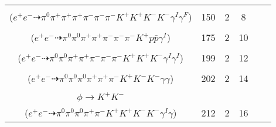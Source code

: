\documentclass[landscape]{article}
\newcounter{rownumbers}
\newcommand\rn{\stepcounter{rownumbers}\arabic{rownumbers}}
\newcommand{\EOLP}{\\ \hline} %
\newcommand{\topoTags}[1]{#1} %
\begin{document}
\begin{longtable}{clcccc}
\rn & \makecell[l]{ $ 
e^{+} e^{-} \rightarrow \rho^{0} \pi^{-} \bar{K}^{*} \bar{D}^{0} D_{s}^{+} \gamma^{I} ,
\rho^{0} \rightarrow \pi^{+} \pi^{-} ,
\bar{K}^{*} \rightarrow \pi^{+} K^{-} ,
\bar{D}^{0} \rightarrow \pi^{0} \pi^{-} K^{+} \gamma^{F} ,
D_{s}^{+} \rightarrow \pi^{+} K^{+} K^{-} 
$ \\ ($
e^{+} e^{-} \dashrightarrow \pi^{0} \pi^{+} \pi^{+} \pi^{+} \pi^{-} \pi^{-} \pi^{-} K^{+} K^{+} K^{-} K^{-} \gamma^{I} \gamma^{F} 
$) } & \topoTags{150 & }2 & 8 \EOLP

\rn & \makecell[l]{ $ 
e^{+} e^{-} \rightarrow D^{-} \bar{\Delta}^{0} \Sigma_{c}^{*+} \gamma^{I} ,
D^{-} \rightarrow \pi^{-} \pi^{-} K^{+} ,
\bar{\Delta}^{0} \rightarrow \pi^{+} \bar{p} ,
\Sigma_{c}^{*+} \rightarrow \pi^{0} \Lambda_{c}^{+} ,
\Lambda_{c}^{+} \rightarrow \pi^{0} \pi^{+} \Lambda ,
\Lambda \rightarrow \pi^{-} p 
$ \\ ($
e^{+} e^{-} \dashrightarrow \pi^{0} \pi^{0} \pi^{+} \pi^{+} \pi^{-} \pi^{-} \pi^{-} K^{+} p \bar{p} \gamma^{I} 
$) } & \topoTags{175 & }2 & 10 \EOLP

\rn & \makecell[l]{ $ 
e^{+} e^{-} \rightarrow \pi^{+} D^{*-} D^{0} \gamma^{I} \gamma^{I} ,
D^{*-} \rightarrow \pi^{-} \bar{D}^{0} ,
D^{0} \rightarrow \pi^{0} \pi^{+} \pi^{-} K^{+} K^{-} ,
\bar{D}^{0} \rightarrow \pi^{0} \pi^{-} K^{+} 
$ \\ ($
e^{+} e^{-} \dashrightarrow \pi^{0} \pi^{0} \pi^{+} \pi^{+} \pi^{-} \pi^{-} \pi^{-} K^{+} K^{+} K^{-} \gamma^{I} \gamma^{I} 
$) } & \topoTags{199 & }2 & 12 \EOLP

\rn & \makecell[l]{ $ 
e^{+} e^{-} \rightarrow \pi^{+} K^{*-} D^{-} D_{s}^{+} ,
K^{*-} \rightarrow \pi^{0} K^{-} ,
D^{-} \rightarrow \pi^{0} \pi^{-} K^{+} K^{-} ,
D_{s}^{+} \rightarrow \rho^{+} \eta ,
\rho^{+} \rightarrow \pi^{0} \pi^{+} ,
\eta \rightarrow \gamma \gamma 
$ \\ ($
e^{+} e^{-} \dashrightarrow \pi^{0} \pi^{0} \pi^{0} \pi^{+} \pi^{+} \pi^{-} K^{+} K^{-} K^{-} \gamma \gamma 
$) } & \topoTags{202 & }2 & 14 \EOLP

\rn & \makecell[l]{ $ 
e^{+} e^{-} \rightarrow K^{+} D^{*0} D_{s}^{*-} \gamma^{I} ,
D^{*0} \rightarrow \pi^{0} D^{0} ,
D_{s}^{*-} \rightarrow D_{s}^{-} \gamma ,
D^{0} \rightarrow \pi^{0} \pi^{+} K^{-} ,
D_{s}^{-} \rightarrow \rho^{-} \phi ,
\rho^{-} \rightarrow \pi^{0} \pi^{-} ,
$ \\ $
\phi \rightarrow K^{+} K^{-} 
$ \\ ($
e^{+} e^{-} \dashrightarrow \pi^{0} \pi^{0} \pi^{0} \pi^{+} \pi^{-} K^{+} K^{+} K^{-} K^{-} \gamma^{I} \gamma 
$) } & \topoTags{212 & }2 & 16 \EOLP


\end{longtable}
\end{document}

